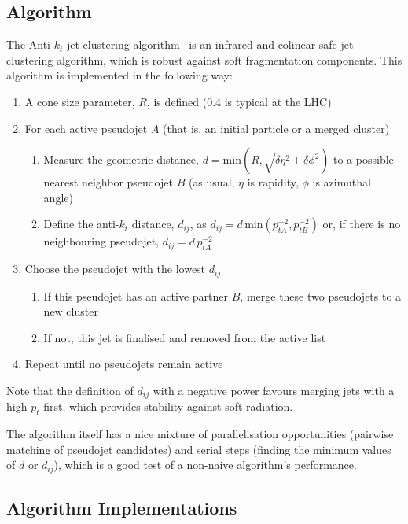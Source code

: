 \documentclass{webofc}
\begin{document}
\subsection{Algorithm}
\label{sec:alg}

The Anti-$k_t$ jet clustering algorithm~\cite{Matteo_Cacciari_2008} is an
infrared and colinear safe jet clustering algorithm, which is robust against
soft fragmentation components. This algorithm is implemented in the following
way:

\begin{enumerate}[itemsep=2pt,parsep=2pt,partopsep=0pt]
  \item A cone size parameter, $R$, is defined (0.4 is typical at the LHC)
  \item For each active pseudojet $A$ (that is, an initial particle or a merged cluster)
  \begin{enumerate}
    \item Measure the geometric distance, $d=\mathrm{min}(R, \sqrt{\delta\eta^2 + \delta\phi^2})$ to a possible nearest neighbor pseudojet $B$ (as usual, $\eta$ is rapidity, $\phi$ is azimuthal angle)
    \item Define the anti-$k_t$ distance, $d_{ij}$, as $d_{ij} = d \, \mathrm{min}(p^{-2}_{tA}, p^{-2}_{tB})$ or, if there is no neighbouring pseudojet, $d_{ij} = d \, p^{-2}_{tA}$
  \end{enumerate}
  \item Choose the pseudojet with the lowest $d_{ij}$
  \begin{enumerate}
    \item If this pseudojet has an active partner $B$, merge these two pseudojets to a new cluster
    \item If not, this jet is finalised and removed from the active list
  \end{enumerate}
  \item Repeat until no pseudojets remain active
\end{enumerate}

Note that the definition of $d_{ij}$ with a negative power favours merging jets with a high $p_t$ first, which provides stability against soft radiation.

The algorithm itself has a nice mixture of parallelisation opportunities
(pairwise matching of pseudojet candidates) and serial steps (finding the
minimum values of $d$ or $d_{ij}$), which is a good test of a non-naive
algorithm's performance.

\subsection{Algorithm Implementations}
\label{sec:algimp}
\end{document}
